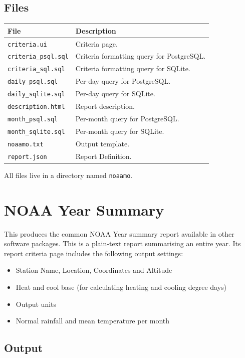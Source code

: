 \documentclass[a4paper,10pt]{book}
\begin{document}
\subsection{Files}
\begin{tabular}{p{4.5cm} l}
\hline
\textbf{File} & \textbf{Description} \\
\hline
\verb|criteria.ui| & Criteria page. \\
\verb|criteria_psql.sql| & Criteria formatting query for PostgreSQL. \\
\verb|criteria_sql.sql| & Criteria formatting query for SQLite. \\
\verb|daily_psql.sql| & Per-day query for PostgreSQL. \\
\verb|daily_sqlite.sql| & Per-day query for SQLite. \\
\verb|description.html| & Report description. \\
\verb|month_psql.sql| & Per-month query for PostgreSQL. \\
\verb|month_sqlite.sql| & Per-month query for SQLite. \\
\verb|noaamo.txt| & Output template. \\
\verb|report.json| & Report Definition. \\
\hline
\end{tabular}

All files live in a directory named \verb|noaamo|.

\section{NOAA Year Summary}
This produces the common NOAA Year summary report available in other software packages. This is a plain-text report summarising an entire year. Its report criteria page includes the following output settings:
\begin{itemize}
\item Station Name, Location, Coordinates and Altitude
\item Heat and cool base (for calculating heating and cooling degree days)
\item Output units
\item Normal rainfall and mean temperature per month
\end{itemize}

\subsection{Output}
\end{document}
